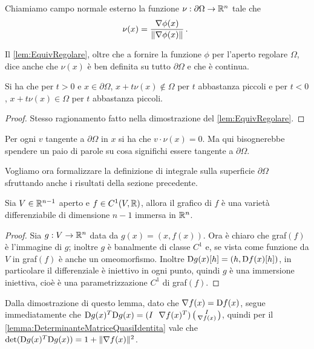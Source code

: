 \begin{definition}
	Chiamiamo campo normale esterno la funzione $\nu:\partial\Omega\rightarrow \mathbb R^n$ tale che
	\[
		\nu(x)=\frac{\nabla \phi(x)}{\lVert\nabla \phi(x)\rVert}\, \text{. }
	\]
\end{definition}

\begin{remark}
	Il \cref{lem:EquivRegolare}, oltre che a fornire la funzione $\phi$ per l'aperto regolare $\Omega$, dice anche che $\nu(x)$ è ben definita
	su tutto $\partial \Omega$ e che è continua.
\end{remark}

\begin{remark}
	Si ha che per $t>0$ e $x\in\partial\Omega$, $x+t\nu(x)\notin \Omega$ per $t$ abbastanza piccoli e per $t<0$, $x+t\nu(x)\in \Omega$ per $t$
	abbastanza piccoli.
\end{remark}
\begin{proof}
	Stesso ragionamento fatto nella dimostrazione del \cref{lem:EquivRegolare}.
\end{proof}

\begin{remark}
	Per ogni $v$ tangente a $\partial\Omega$ in $x$ si ha che $v\cdot\nu(x)=0$. Ma qui bisognerebbe spendere un paio di parole su cosa significhi
	essere tangente a $\partial\Omega$.
\end{remark}


Vogliamo ora formalizzare la definizione di integrale sulla superficie $\partial\Omega$ sfruttando anche i risultati della sezione precedente.

\begin{lemma}\label{lem:GrapVar}
	Sia $V\in\mathbb R^{n-1}$ aperto e $f\in C^1(V,\mathbb R)$, allora il grafico di $f$ è una varietà differenziabile di dimensione $n-1$ immersa in $\mathbb R^n$.
\end{lemma}
\begin{proof}
	Sia $g:V\rightarrow \mathbb R^n$ data da $g(x)=(x,f(x))$. Ora è chiaro che graf$(f)$ è l'immagine di $g$; inoltre $g$ è banalmente di classe $C^1$
	e, se vista come funzione da $V$ in graf$(f)$ è anche un omeomorfismo. Inoltre $\mathrm D g(x)[h]=(h,\mathrm D f(x)[h])$, in particolare il differenziale è
	iniettivo in ogni punto, quindi $g$ è una immersione iniettiva, cioè è una parametrizzazione $C^1$ di graf$(f)$.
\end{proof}

\begin{remark}
	Dalla dimostrazione di questo lemma, dato che $\nabla f(x)=\mathrm D f(x)$, segue immediatamente che $\mathrm D g(x)^T \mathrm D g(x)=
	(I \ \ \nabla f(x)^T)
	\left(\begin{smallmatrix}
	I \\
	\nabla f(x)
	\end{smallmatrix}\right)$, quindi per il \cref{lemma:DeterminanteMatriceQuasiIdentita} vale che $\det (\mathrm D g(x)^T \mathrm D g(x)) = 1+\lVert\nabla f(x)\rVert^2$. 
\end{remark}

